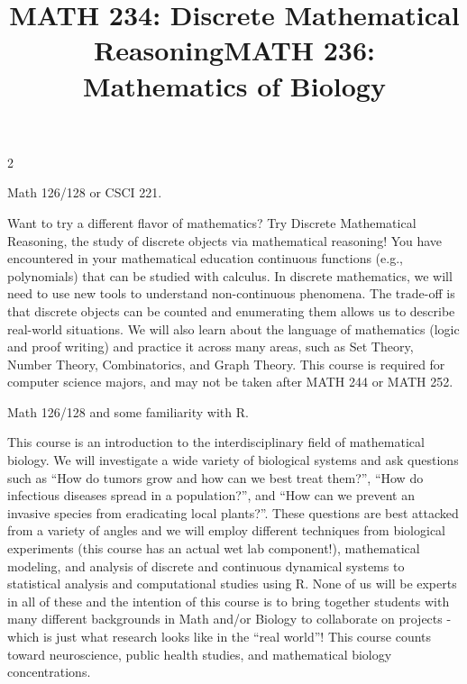 \documentclass[12pt]{article}
\newcommand{\bolder}{\textbf}
\begin{document}
\begin{multicols}{2}
\begin{tcolorbox}[colback=white, colframe=black]
    \begin{center}
    \title{{\large \bolder{MATH 234: Discrete Mathematical Reasoning}}}
    \end{center}
\end{tcolorbox}

 Math 126/128 or CSCI 221.

Want to try a different flavor of mathematics? Try Discrete Mathematical Reasoning, the study of discrete objects via mathematical reasoning! You have encountered in your mathematical education continuous functions (e.g., polynomials) that can be studied with calculus. In discrete mathematics, we will need to use new tools to understand non-continuous phenomena. The trade-off is that discrete objects can be counted and enumerating them allows us to describe real-world situations. We will also learn about the language of mathematics (logic and proof writing) and practice it across many areas, such as Set Theory, Number Theory, Combinatorics, and Graph Theory. This course is required for computer science majors, and may not be taken after MATH 244 or MATH 252.



\begin{tcolorbox}[colback=white, colframe=black]
    \begin{center}
    \title{{\large \bolder{MATH 236: Mathematics of Biology}}}
    \end{center}
\end{tcolorbox}

 Math 126/128 and some familiarity with R.

This course is an introduction to the interdisciplinary field of mathematical biology. We will investigate a wide variety of biological systems and ask questions such as “How do tumors grow and how can we best treat them?”, “How do infectious diseases spread in a population?”, and “How can we prevent an invasive species from eradicating local plants?”.
These questions are best attacked from a variety of angles and we will employ different techniques from biological experiments (this course has an actual wet lab component!), mathematical modeling, and analysis of discrete and continuous dynamical systems to statistical analysis and computational studies using R. None of us will be experts in all of these and the intention of this course is to bring together students with many different backgrounds in Math and/or Biology to collaborate on projects - which is just what research looks like in the “real world”!  This course counts toward neuroscience, public health studies, and mathematical biology concentrations.



\end{multicols}
\end{document}
